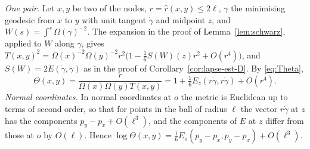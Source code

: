 \documentclass[11pt,a4paper]{article}
\makeatletter
\theoremstyle{stmt}
\theoremstyle{defn}
\theoremstyle{rmk}
\renewenvironment{proof}[1][\proofname]{\par\pushQED{\qed}\normalfont\topsep6\p@\@plus6\p@\relax
  \trivlist\item[\hskip\labelsep{\sffamily\itshape\small #1.}]\ignorespaces}{\popQED\endtrivlist\@endpefalse}
\numberwithin{equation}{section}
\makeatother
\begin{document}
{\begin{proof}
\emph{One pair.} Let $x,y$ be two of the nodes, $r=\hat r(x,y)\le2\ell$, $\gamma$ the minimising geodesic from $x$ to $y$ with unit tangent $\dot\gamma$ and midpoint $z$, and $W(s)=\int^s\Omega(\gamma)^{-2}$. The expansion in the proof of Lemma~\ref{lem:schwarz}, applied to $W$ along $\gamma$, gives $T(x,y)^2=\Omega(x)^{-2}\Omega(y)^{-2}r^2\big(1-\tfrac16S(W)(z)r^2+O(r^4)\big)$, and $S(W)=2E(\dot\gamma,\dot\gamma)$ as in the proof of Corollary~\ref{cor:lapse-est-D}. By \eqref{eq:Theta},
\[
\Theta(x,y)=\frac{r}{\Omega(x)\Omega(y)T(x,y)}=1+\tfrac16E_z(r\dot\gamma,r\dot\gamma)+O(r^4).
\]
\emph{Normal coordinates.} In normal coordinates at $o$ the metric is Euclidean up to terms of second order, so that for points in the ball of radius $\ell$ the vector $r\dot\gamma$ at $z$ has the components $p_y-p_x+O(\ell^3)$, and the components of $E$ at $z$ differ from those at $o$ by $O(\ell)$. Hence $\log\Theta(x,y)=\tfrac16E_o(p_y-p_x,p_y-p_x)+O(\ell^3)$.


\end{proof}}
\end{document}
